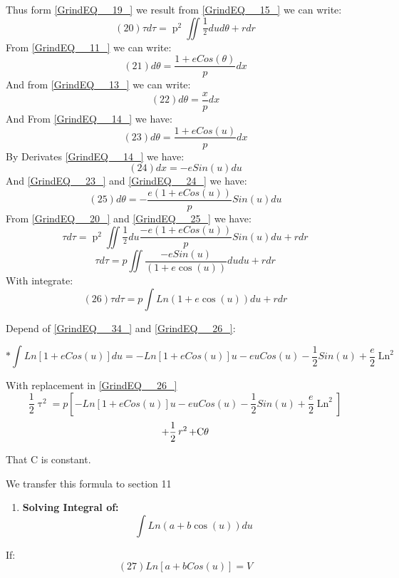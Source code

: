 \documentclass{article}
\begin{document}
\noindent Thus form \eqref{GrindEQ__19_} we result from \eqref{GrindEQ__15_} we can write:
\[                            (20)        \tau d\tau =\mathop{p}\nolimits^{2} \iint \frac{1}{\mathop{\left(1+e\cos \left(u\right)\right)}\nolimits^{2} } dud\theta  +rdr\] 
From \eqref{GrindEQ__11_} we can write:
\[                            (21)                   d\theta =\frac{1+eCos(\theta )}{p} dx\] 
And from \eqref{GrindEQ__13_} we can write:
\[                            (22)                         d\theta =\frac{x}{p} dx\] 
And From \eqref{GrindEQ__14_} we have:
\[                          (23)               d\theta =\frac{1+eCos(u)}{p} dx\] 
By Derivates \eqref{GrindEQ__14_} we have:
\[                           (24)                   dx=-eSin(u)du\] 
And \eqref{GrindEQ__23_} and \eqref{GrindEQ__24_} we have:
\[                           (25)                   d\theta =-\frac{e(1+eCos(u))}{p} Sin(u)du\] 
From \eqref{GrindEQ__20_} and \eqref{GrindEQ__25_} we have:
\[\tau d\tau =\mathop{p}\nolimits^{2} \iint \frac{1}{\mathop{\left(1+e\cos \left(u\right)\right)}\nolimits^{2} } du\frac{-e(1+eCos(u))}{p} Sin(u)du +rdr\] 
\[\tau d\tau =p\iint \frac{-eSin(u)}{\left(1+e\cos \left(u\right)\right)} dudu +rdr\] 
With integrate:
\[                       (26)          \tau d\tau =p\int Ln\left(1+e\cos \left(u\right)\right) du+rdr\] 


\noindent Depend of \eqref{GrindEQ__34_} and \eqref{GrindEQ__26_}:

\noindent 
\[*\int Ln\left[1+eCos(u)\right] du=-Ln\left[1+eCos(u)\right]u-euCos(u)-\frac{1}{2} Sin(u)+\frac{e}{2} \mathop{Ln[1+eCos(u)]}\nolimits^{2} \] 


\noindent 

\noindent With replacement in \eqref{GrindEQ__26_}
\[\frac{1}{2} \mathop{\tau }\nolimits^{2} =p\left[-Ln\left[1+eCos(u)\right]u-euCos(u)-\frac{1}{2} Sin(u)+\frac{e}{2} \mathop{Ln[1+eCos(u)]}\nolimits^{2} \right]\] 
\[+\frac{1}{2} \mathop{r}\nolimits^{2} +{\rm C}\theta \] 
\textbf{}

\noindent \textbf{}

\noindent \textbf{}

\noindent 

\noindent 

\noindent 

\noindent That C is constant.

\noindent We transfer this formula to section 11

\begin{enumerate}
\item  \textbf{Solving Integral of:}
\[\int Ln\left(a+b\cos \left(u\right)\right) du\] 
\end{enumerate}
If:
\[                          (27)          Ln[a+bCos(u)]=V\] 
\end{document}
